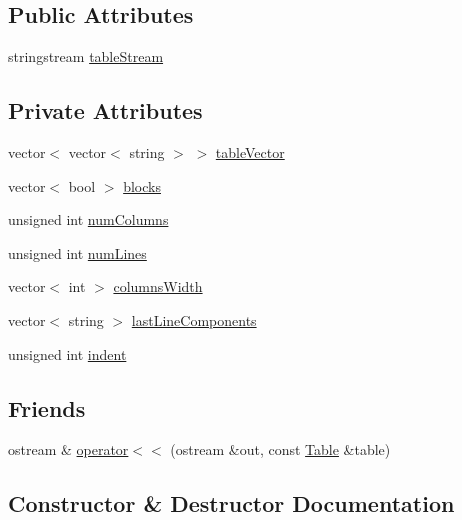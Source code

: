 \subsection*{Public Attributes}
\begin{DoxyCompactItemize}
\item 
stringstream \hyperlink{class_table_a9df4c1c33927ef0b7cd474d4420a7278}{table\+Stream}
\end{DoxyCompactItemize}
\subsection*{Private Attributes}
\begin{DoxyCompactItemize}
\item 
vector$<$ vector$<$ string $>$ $>$ \hyperlink{class_table_a9052c218f9eae23950459720e8069e62}{table\+Vector}
\item 
vector$<$ bool $>$ \hyperlink{class_table_a733288d34b5fd55085572f212fbe0260}{blocks}
\item 
unsigned int \hyperlink{class_table_a88a6ec978fe9116bbfed4e7aa066b5e2}{num\+Columns}
\item 
unsigned int \hyperlink{class_table_a0e4ed290246197725eee0c0a266b85d2}{num\+Lines}
\item 
vector$<$ int $>$ \hyperlink{class_table_a36e32fdefca7b32f938d0029496c4238}{columns\+Width}
\item 
vector$<$ string $>$ \hyperlink{class_table_a2e6a2cba72cb9975758d05507ded659e}{last\+Line\+Components}
\item 
unsigned int \hyperlink{class_table_a4e5eecbb3e6363585df871429381f433}{indent}
\end{DoxyCompactItemize}
\subsection*{Friends}
\begin{DoxyCompactItemize}
\item 
ostream \& \hyperlink{class_table_af5e0f2c2e64aa1dc084c36859c54a289}{operator$<$$<$} (ostream \&out, const \hyperlink{class_table}{Table} \&table)
\end{DoxyCompactItemize}


\subsection{Constructor \& Destructor Documentation}
\hypertarget{class_table_a80b23f471aa594c4d1a1db51a22fb6c4}{}\label{class_table_a80b23f471aa594c4d1a1db51a22fb6c4} 
